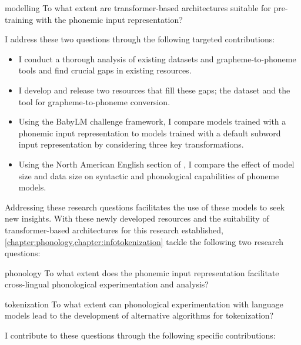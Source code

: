 \begin{question}{}{modelling}
    To what extent are transformer-based architectures suitable for pre-training with the phonemic input representation?
\end{question}

I address these two questions through the following targeted contributions:

\begin{itemize}
    \item I conduct a thorough analysis of existing datasets and grapheme-to-phoneme tools and find crucial gaps in existing resources.
    \item I develop and release two resources that fill these gaps; the \ipachildes dataset and the \gpp tool for grapheme-to-phoneme conversion.
    \item Using the BabyLM challenge framework, I compare models trained with a phonemic input representation to models trained with a default subword input representation by considering three key transformations.
    \item Using the North American English section of \ipachildes, I compare the effect of model size and data size on syntactic and phonological capabilities of phoneme models. 
\end{itemize}

Addressing these research questions facilitates the use of these models to seek new insights. With these newly developed resources and the suitability of transformer-based architectures for this research established, \cref{chapter:phonology,chapter:infotokenization} tackle the following two research questions:

\begin{question}{}{phonology}
    To what extent does the phonemic input representation facilitate cross-lingual phonological experimentation and analysis?
\end{question}

\begin{question}{}{tokenization}
    To what extent can phonological experimentation with language models lead to the development of alternative algorithms for tokenization? 
\end{question}

I contribute to these questions through the following specific contributions:

